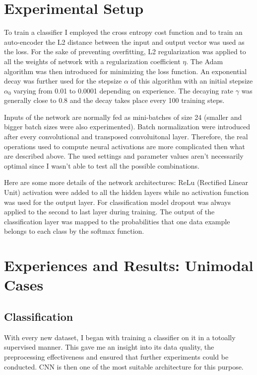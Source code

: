 \section{Experimental Setup}

To train a classifier I employed the cross entropy cost function and to
train an auto-encoder the L2 distance between the input and output vector
was used as the loss. For the sake of preventing overfitting, L2
regularization \cite{Y. Bengio 2012} was applied to all the weights of
network with a regularization coefficient $\eta$.
The Adam algorithm \cite{D. Kingma 2014}
was then introduced for minimizing the loss function.
An exponential decay was further used for the stepsize $\alpha$ of this
algorithm with an initial stepsize $\alpha_0$ varying from 0.01 to 0.0001
depending on experience. The decaying rate $\gamma$
was generally close to 0.8 and
the decay takes place every 100 training steps.

Inputs of the network are normally fed as mini-batches of size 24
(smaller and bigger batch sizes were also experimented).
Batch normalization \cite{S. Ioffe 2015} were introduced after every
convolutional and transposed convoluitonal layer. Therefore, the real
operations used to compute neural activations are more complicated
then what are described above. The used settings and parameter
values aren't necessarily optimal since I wasn't able to test all the
possible combinations.

Here are some more details of the network architectures: ReLu
(Rectified Linear Unit) activation were added to all the hidden layers
\cite{A. Krizhevsky 2012} while no activation function was used for
the output layer.
For classification model dropout \cite{N. Srivastava 2014}
was always applied to the second to last layer during training.
The output of the classification layer was mapped to the probabilities
that one data example belongs to each class by the softmax function.

\section{Experiences and Results: Unimodal Cases}

\subsection{Classification}

With every new dataset, I began with training a classifier on it in a
totoally supervised manner.
This gave me an insight into its data quality, the preprocessing
effectiveness and ensured that further experiments could be conducted.
CNN is then one of the most suitable architecture for this purpose.

